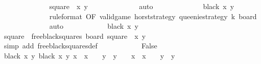 \begin{isabellebody}
\ \ \ \ \ \ \ \ \ \ \ \ \isamarkupfalse%
\ {\isacharbackquoteopen}square\ {\isacharequal}\ {\isacharparenleft}x{\isacharcomma}\ y{\isacharparenright}{\isacharbackquoteclose}\isanewline
\ \ \ \ \ \ \ \ \ \ \ \ \isamarkupfalse%
\ auto\isanewline
\ \ \ \ \ \ \ \ \ \ \isamarkupfalse%
\ \isamarkupfalse%
\ {\isachardoublequoteopen}black\ {\isacharparenleft}x{\isacharprime}{\isacharcomma}\ y{\isacharprime}{\isacharparenright}{\isachardoublequoteclose}\isanewline
\ \ \ \ \ \ \ \ \ \ \ \ \isamarkupfalse%
\ {}{\isacharbrackleft}rule{\isacharunderscore}format{\isacharcomma}\ OF\ {\isacharbackquoteopen}valid{\isacharunderscore}game\ {\isacharquery}horst{\isacharunderscore}strategy\ queenie{\isacharunderscore}strategy\ k\ board{\isacharbackquoteclose}{\isacharbrackright}\isanewline
\ \ \ \ \ \ \ \ \ \ \ \ \isamarkupfalse%
\ auto\isanewline
\isanewline
\ \ \ \ \ \ \ \ \ \ \isamarkupfalse%
\ {\isachardoublequoteopen}black\ {\isacharparenleft}x{\isacharcomma}\ y{\isacharparenright}{\isachardoublequoteclose}\isanewline
\ \ \ \ \ \ \ \ \ \ \ \ \isamarkupfalse%
\ {\isacharbackquoteopen}square\ {\isasymin}\ free{\isacharunderscore}black{\isacharunderscore}squares\ board{\isacharbackquoteclose}\ {\isacharbackquoteopen}square\ {\isacharequal}\ {\isacharparenleft}x{\isacharcomma}\ y{\isacharparenright}{\isacharbackquoteclose}\isanewline
\ \ \ \ \ \ \ \ \ \ \ \ \isamarkupfalse%
\ {\isacharparenleft}simp\ add{\isacharcolon}\ free{\isacharunderscore}black{\isacharunderscore}squares{\isacharunderscore}def{\isacharparenright}\isanewline
\isanewline
\ \ \ \ \ \ \ \ \ \ \isamarkupfalse%
\ False\isanewline
\ \ \ \ \ \ \ \ \ \ \ \ \isamarkupfalse%
\ {\isacharbackquoteopen}black\ {\isacharparenleft}x{\isacharcomma}\ y{\isacharparenright}{\isacharbackquoteclose}\ {\isacharbackquoteopen}black\ {\isacharparenleft}x{\isacharprime}{\isacharcomma}\ y{\isacharprime}{\isacharparenright}{\isacharbackquoteclose}\ {\isacharbackquoteopen}{\isasymbar}x\ {\isacharminus}\ x{\isacharprime}{\isasymbar}\ {\isacharequal}\ {}\ {\isasymand}\ {\isasymbar}y\ {\isacharminus}\ y{\isacharprime}{\isasymbar}\ {\isacharequal}\ {}\ {\isasymor}\ {\isasymbar}x\ {\isacharminus}\ x{\isacharprime}{\isasymbar}\ {\isacharequal}\ {}\ {\isasymand}\ {\isasymbar}y\ {\isacharminus}\ y{\isacharprime}{\isasymbar}\ {\isacharequal}\ {}{\isacharbackquoteclose}\isanewline
\ \ \ \ \ \ \ \ \ \ \ \ \isamarkupfalse%

\end{isabellebody}
